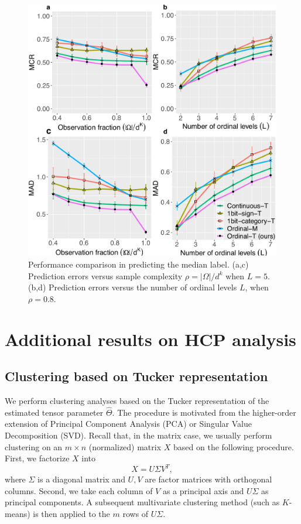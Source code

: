 \documentclass[11pt]{article}
\theoremstyle{plain}
\theoremstyle{definition}
\begin{document}
\begin{figure}[H]
  \begin{center}
    \includegraphics[width=.8\textwidth]{panel3.pdf}
  \end{center}
  \caption{Performance comparison in predicting the median label. (a,c) Prediction errors versus sample complexity $\rho=|\Omega|/d^k$ when $L=5$. (b,d) Prediction errors versus the number of ordinal levels $L$, when $\rho=0.8.$}
\end{figure}

\section{Additional results on HCP analysis}
\subsection{Clustering based on Tucker representation}\label{sec:clustering}
We perform clustering analyses based on the Tucker representation of the estimated tensor parameter $\hat\Theta$. The procedure is motivated from the higher-order extension of Principal Component Analysis (PCA) or Singular Value Decomposition (SVD). Recall that, in the matrix case, we usually perform clustering on an $m\times n$ (normalized) matrix $X$ based on the following procedure. First, we factorize $X$ into
\begin{equation}
X = U\Sigma V^T,
\end{equation}
where $\Sigma$ is a diagonal matrix and $ U,V$ are factor matrices with orthogonal columns. Second, we take each column of $V$ as a principal axis and $U\Sigma$ as principal components. A subsequent multivariate clustering method (such as $K$-means) is then applied to the $m$ rows of $U\Sigma$. 
\end{document}
